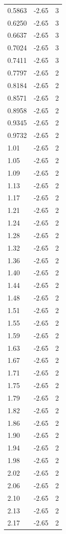 \begin{longtable}{lrr}
  0.5863 & -2.65 & 3 \\
  0.6250 & -2.65 & 3 \\
  0.6637 & -2.65 & 3 \\
  0.7024 & -2.65 & 3 \\
  0.7411 & -2.65 & 3 \\
  0.7797 & -2.65 & 2 \\
  0.8184 & -2.65 & 2 \\
  0.8571 & -2.65 & 2 \\
  0.8958 & -2.65 & 2 \\
  0.9345 & -2.65 & 2 \\
  0.9732 & -2.65 & 2 \\
  1.01 & -2.65 & 2 \\
  1.05 & -2.65 & 2 \\
  1.09 & -2.65 & 2 \\
  1.13 & -2.65 & 2 \\
  1.17 & -2.65 & 2 \\
  1.21 & -2.65 & 2 \\
  1.24 & -2.65 & 2 \\
  1.28 & -2.65 & 2 \\
  1.32 & -2.65 & 2 \\
  1.36 & -2.65 & 2 \\
  1.40 & -2.65 & 2 \\
  1.44 & -2.65 & 2 \\
  1.48 & -2.65 & 2 \\
  1.51 & -2.65 & 2 \\
  1.55 & -2.65 & 2 \\
  1.59 & -2.65 & 2 \\
  1.63 & -2.65 & 2 \\
  1.67 & -2.65 & 2 \\
  1.71 & -2.65 & 2 \\
  1.75 & -2.65 & 2 \\
  1.79 & -2.65 & 2 \\
  1.82 & -2.65 & 2 \\
  1.86 & -2.65 & 2 \\
  1.90 & -2.65 & 2 \\
  1.94 & -2.65 & 2 \\
  1.98 & -2.65 & 2 \\
  2.02 & -2.65 & 2 \\
  2.06 & -2.65 & 2 \\
  2.10 & -2.65 & 2 \\
  2.13 & -2.65 & 2 \\
  2.17 & -2.65 & 2 \\

\end{longtable}
